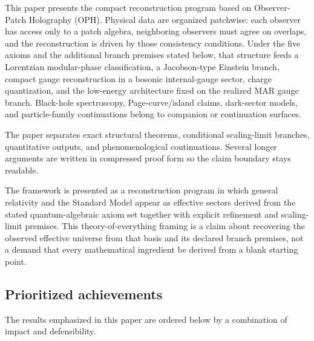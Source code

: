 \documentclass[11pt]{article}
\begin{document}
This paper presents the compact reconstruction program based on Observer-Patch Holography (OPH).
Physical data are organized patchwise: each observer has access only to a patch algebra,
neighboring observers must agree on overlaps, and the reconstruction is driven by those
consistency conditions. Under the five axioms and the additional branch premises stated below,
that structure feeds a Lorentzian modular-phase classification, a Jacobson-type Einstein branch,
compact gauge reconstruction in a bosonic internal-gauge sector, charge quantization, and the
low-energy architecture fixed on the realized MAR gauge branch.
Black-hole spectroscopy, Page-curve/island claims, dark-sector models, and particle-family
continuations belong to companion or continuation surfaces.

The paper separates exact structural theorems, conditional scaling-limit branches, quantitative outputs, and phenomenological continuations. Several longer arguments are written in compressed proof form so the claim boundary stays readable.

The framework is presented as a reconstruction program in which general relativity and the Standard Model appear as effective sectors derived from the stated quantum-algebraic axiom set together with explicit refinement and scaling-limit premises. This theory-of-everything framing is a claim about recovering the observed effective universe from that basis and its declared branch premises, not a demand that every mathematical ingredient be derived from a blank starting point.

\subsection*{Prioritized achievements}

The results emphasized in this paper are ordered below by a combination of impact and defensibility.
\end{document}
